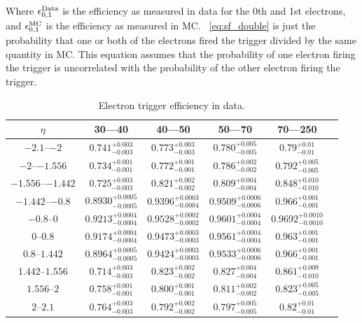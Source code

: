 Where $\epsilon^{\text{Data}}_{0,1}$ is the efficiency as measured in data for the 0th and
1st electrons, and $\epsilon^{\text{MC}}_{0,1}$ is the efficiency as measured in MC.
\EQ~\ref{eq:sf_double} is just the probability that one or both of the
electrons fired the trigger divided by the same quantity in MC. This equation
assumes that the probability of one electron firing the trigger is uncorrelated
with the probability of the other electron firing the trigger.

\begin{table}[h]
\begin{center}
    \begin{tabular}{ | c | c | c | c | c | c |} \hline
	$\eta$ & 30---40 \GeV & 40---50 \GeV & 50---70 \GeV & 70---250 \GeV  \\ \hline
	$\numrange{-2.1}{-2}$ & $0.741^{+0.003}_{-0.003}$ & $0.773^{+0.003}_{-0.003}$ & $0.780^{+0.005}_{-0.005}$ & $0.79^{+0.01}_{-0.01}$  \\ \hline
	$\numrange{-2}{-1.556}$ & $0.734^{+0.001}_{-0.001}$ & $0.772^{+0.001}_{-0.001}$ & $0.786^{+0.002}_{-0.002}$ & $0.792^{+0.005}_{-0.005}$  \\ \hline
	$\numrange{-1.556}{-1.442}$ & $0.725^{+0.003}_{-0.003}$ & $0.821^{+0.002}_{-0.002}$ & $0.809^{+0.004}_{-0.004}$ & $0.848^{+0.010}_{-0.010}$  \\ \hline
	$\numrange{-1.442}{-0.8}$ & $0.8930^{+0.0005}_{-0.0005}$ & $0.9396^{+0.0003}_{-0.0004}$ & $0.9509^{+0.0006}_{-0.0006}$ & $0.966^{+0.001}_{-0.001}$  \\ \hline
	$\numrange{-0.8}{0}$ & $0.9213^{+0.0004}_{-0.0004}$ & $0.9528^{+0.0002}_{-0.0002}$ & $0.9601^{+0.0004}_{-0.0004}$ & $0.9692^{+0.0010}_{-0.0010}$  \\ \hline
	$\numrange{0}{0.8}$ & $0.9174^{+0.0004}_{-0.0004}$ & $0.9473^{+0.0003}_{-0.0003}$ & $0.9561^{+0.0004}_{-0.0004}$ & $0.963^{+0.001}_{-0.001}$  \\ \hline
	$\numrange{0.8}{1.442}$ & $0.8964^{+0.0005}_{-0.0005}$ & $0.9424^{+0.0003}_{-0.0003}$ & $0.9533^{+0.0006}_{-0.0006}$ & $0.966^{+0.001}_{-0.001}$  \\ \hline
	$\numrange{1.442}{1.556}$ & $0.714^{+0.003}_{-0.003}$ & $0.823^{+0.002}_{-0.002}$ & $0.827^{+0.004}_{-0.004}$ & $0.861^{+0.009}_{-0.010}$  \\ \hline
	$\numrange{1.556}{2}$ & $0.758^{+0.001}_{-0.001}$ & $0.800^{+0.001}_{-0.001}$ & $0.811^{+0.002}_{-0.002}$ & $0.823^{+0.005}_{-0.005}$  \\ \hline
	$\numrange{2}{2.1}$ & $0.764^{+0.003}_{-0.003}$ & $0.792^{+0.002}_{-0.002}$ & $0.797^{+0.005}_{-0.005}$ & $0.82^{+0.01}_{-0.01}$  \\ \hline
    \end{tabular}
\end{center}
\centering
\caption{
    Electron trigger efficiency in data.
}
\label{trigger_eff_data}
\end{table}

